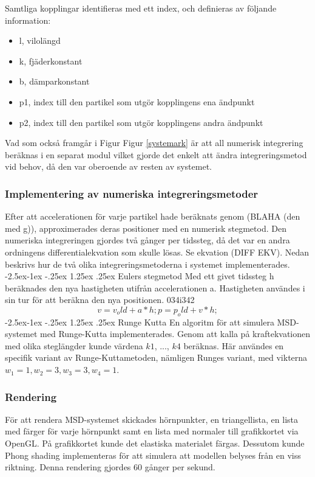 \documentclass[a4paper,12pt,oneside,final,swedish]{extarticle}
\makeatletter
\renewcommand\paragraph{\@startsection{paragraph}{4}{\z@}%
            {-2.5ex\@plus -1ex \@minus -.25ex}%
            {1.25ex \@plus .25ex}%
            {\normalfont\normalsize\bfseries}}
\makeatother
\begin{document}
Samtliga kopplingar identifieras med ett index, och definieras av följande information:
\begin{itemize}
  \item l, vilolängd
  \item k, fjäderkonstant
  \item b, dämparkonstant
  \item p1, index till den partikel som utgör kopplingens ena ändpunkt
  \item p2, index till den partikel som utgör kopplingens andra ändpunkt
\end{itemize}
Vad som också framgår i Figur Figur \ref{systemark} är att all numerisk integrering beräknas i en separat modul vilket gjorde det enkelt att ändra integreringsmetod vid behov, då den var oberoende av resten av systemet.
\subsubsection{Implementering av numeriska integreringsmetoder}
Efter att accelerationen för varje partikel hade beräknats genom (BLAHA (den med g)), approximerades deras positioner med en numerisk stegmetod. Den numeriska integreringen gjordes två gånger per tidssteg, då det var en andra ordningens differentialekvation som skulle lösas. Se ekvation (DIFF EKV). Nedan beskrivs hur de två olika integreringsmetoderna i systemet implementerades.
\paragraph{Eulers stegmetod} 
Med ett givet tidssteg h beräknades den nya hastigheten utifrån accelerationen a. Hastigheten användes i sin tur för att beräkna den nya positionen. 034i342
	\begin{equation} 
	v = v_old + a*h;		%
	p = p_old + v*h; 
	\end{equation}
\paragraph{Runge Kutta}
En algoritm för att simulera MSD-systemet med Runge-Kutta implementerades. Genom att kalla på kraftekvationen med olika steglängder kunde värdena $k1$, ..., $k4$ beräknas. Här användes en specifik variant av Runge-Kuttametoden, nämligen Runges variant, med vikterna \begin{math} w_1 = 1, w_2 = 3, w_3 = 3, w_4 = 1 \end{math}.
\subsubsection{Rendering}
För att rendera MSD-systemet skickades hörnpunkter, en triangellista, en lista med färger för varje hörnpunkt samt en lista med normaler till grafikkortet via OpenGL. På grafikkortet kunde det elastiska materialet färgas. Dessutom kunde Phong shading implementeras för att simulera att modellen belyses från en viss riktning. Denna rendering gjordes 60 gånger per sekund.
\end{document}
